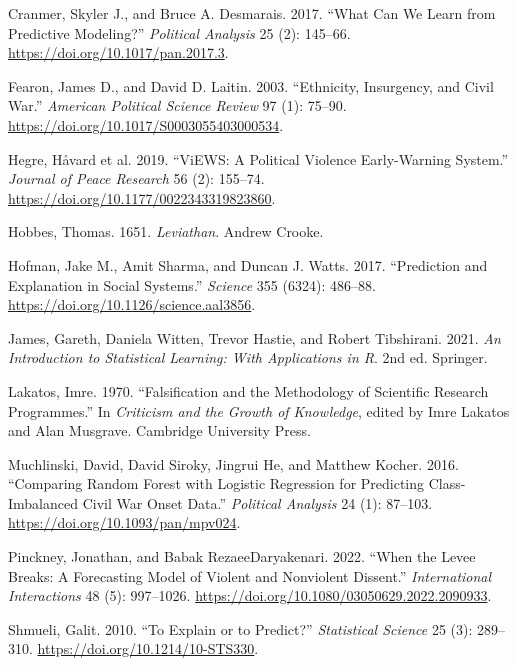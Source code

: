 \documentclass[
  a4paper,
]{scrbook}
\newlength{\cslhangindent}
\newenvironment{CSLReferences}[2] %
 {\begin{list}{}{%
  \setlength{\itemindent}{0pt}
  \setlength{\leftmargin}{0pt}
  \setlength{\parsep}{0pt}
  \ifodd #1
   \setlength{\leftmargin}{\cslhangindent}
   \setlength{\itemindent}{-1\cslhangindent}
  \fi
  \setlength{\itemsep}{#2\baselineskip}}}
 {\end{list}}
\begin{document}
\protect{}\label{refs}
\begin{CSLReferences}{1}{1}
Cranmer, Skyler J., and Bruce A. Desmarais. 2017. {``What Can We Learn
from Predictive Modeling?''} \emph{Political Analysis} 25 (2): 145--66.
\url{https://doi.org/10.1017/pan.2017.3}.

Fearon, James D., and David D. Laitin. 2003. {``Ethnicity, Insurgency,
and Civil War.''} \emph{American Political Science Review} 97 (1):
75--90. \url{https://doi.org/10.1017/S0003055403000534}.

{Hegre, Håvard et al.} 2019. {``{ViEWS}: A Political Violence
Early-Warning System.''} \emph{Journal of Peace Research} 56 (2):
155--74. \url{https://doi.org/10.1177/0022343319823860}.

Hobbes, Thomas. 1651. \emph{Leviathan}. Andrew Crooke.

Hofman, Jake M., Amit Sharma, and Duncan J. Watts. 2017. {``Prediction
and Explanation in Social Systems.''} \emph{Science} 355 (6324):
486--88. \url{https://doi.org/10.1126/science.aal3856}.

James, Gareth, Daniela Witten, Trevor Hastie, and Robert Tibshirani.
2021. \emph{An Introduction to Statistical Learning: With Applications
in {R}}. 2nd ed. Springer.

Lakatos, Imre. 1970. {``Falsification and the Methodology of Scientific
Research Programmes.''} In \emph{Criticism and the Growth of Knowledge},
edited by Imre Lakatos and Alan Musgrave. Cambridge University Press.

Muchlinski, David, David Siroky, Jingrui He, and Matthew Kocher. 2016.
{``Comparing Random Forest with Logistic Regression for Predicting
Class-Imbalanced Civil War Onset Data.''} \emph{Political Analysis} 24
(1): 87--103. \url{https://doi.org/10.1093/pan/mpv024}.

Pinckney, Jonathan, and Babak RezaeeDaryakenari. 2022. {``When the Levee
Breaks: A Forecasting Model of Violent and Nonviolent Dissent.''}
\emph{International Interactions} 48 (5): 997--1026.
\url{https://doi.org/10.1080/03050629.2022.2090933}.

Shmueli, Galit. 2010. {``To Explain or to Predict?''} \emph{Statistical
Science} 25 (3): 289--310. \url{https://doi.org/10.1214/10-STS330}.


\end{CSLReferences}
\end{document}
